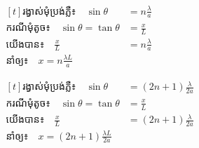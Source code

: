 \noindent
\begin{minipage}[t]{0.54\textwidth}
	$\begin{aligned}[t]
\text{រង្វាស់មុំប្រង់ភ្លឺ៖} \quad \sin\theta &= n\frac{\lambda}{a} \\[0.35em]
\text{ករណីមុំតូច៖} \quad \sin\theta = \tan\theta &= \frac{x}{L} \\[0.35em]
\text{យើងបាន៖} \quad \frac{x}{L} &= n\frac{\lambda}{a} \\[0.55em]
\text{នាំឲ្យ៖} \quad \boxed{x = n\frac{\lambda L}{a}} &
	\end{aligned}$
\end{minipage}%
\hfill
\begin{minipage}[t]{0.43\textwidth}
	\vspace*{0.3em}
\end{minipage}

\noindent
\begin{minipage}[t]{0.54\textwidth}
	$\begin{aligned}[t]
\text{រង្វាស់មុំប្រង់ភ្លឺ៖} \quad \sin\theta &= (2n+1)\frac{\lambda}{2a} \\[0.35em]
\text{ករណីមុំតូច៖} \quad \sin\theta = \tan\theta &= \frac{x}{L} \\[0.35em]
\text{យើងបាន៖} \quad \frac{x}{L} &= (2n+1)\frac{\lambda}{2a} \\[0.55em]
\text{នាំឲ្យ៖} \quad \boxed{x = (2n+1)\frac{\lambda L}{2a}} &
	\end{aligned}$
\end{minipage}%
\hfill
\begin{minipage}[t]{0.43\textwidth}
	\vspace*{0.3em}
\end{minipage}


